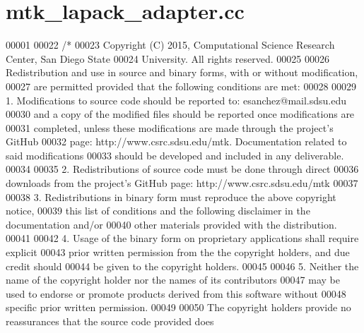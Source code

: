 \hypertarget{mtk__lapack__adapter_8cc_source}{\section{mtk\+\_\+lapack\+\_\+adapter.\+cc}
\label{mtk__lapack__adapter_8cc_source}
}

\begin{DoxyCode}
00001 
00022 \textcolor{comment}{/*}
00023 \textcolor{comment}{Copyright (C) 2015, Computational Science Research Center, San Diego State}
00024 \textcolor{comment}{University. All rights reserved.}
00025 \textcolor{comment}{}
00026 \textcolor{comment}{Redistribution and use in source and binary forms, with or without modification,}
00027 \textcolor{comment}{are permitted provided that the following conditions are met:}
00028 \textcolor{comment}{}
00029 \textcolor{comment}{1. Modifications to source code should be reported to: esanchez@mail.sdsu.edu}
00030 \textcolor{comment}{and a copy of the modified files should be reported once modifications are}
00031 \textcolor{comment}{completed, unless these modifications are made through the project's GitHub}
00032 \textcolor{comment}{page: http://www.csrc.sdsu.edu/mtk. Documentation related to said modifications}
00033 \textcolor{comment}{should be developed and included in any deliverable.}
00034 \textcolor{comment}{}
00035 \textcolor{comment}{2. Redistributions of source code must be done through direct}
00036 \textcolor{comment}{downloads from the project's GitHub page: http://www.csrc.sdsu.edu/mtk}
00037 \textcolor{comment}{}
00038 \textcolor{comment}{3. Redistributions in binary form must reproduce the above copyright notice,}
00039 \textcolor{comment}{this list of conditions and the following disclaimer in the documentation and/or}
00040 \textcolor{comment}{other materials provided with the distribution.}
00041 \textcolor{comment}{}
00042 \textcolor{comment}{4. Usage of the binary form on proprietary applications shall require explicit}
00043 \textcolor{comment}{prior written permission from the the copyright holders, and due credit should}
00044 \textcolor{comment}{be given to the copyright holders.}
00045 \textcolor{comment}{}
00046 \textcolor{comment}{5. Neither the name of the copyright holder nor the names of its contributors}
00047 \textcolor{comment}{may be used to endorse or promote products derived from this software without}
00048 \textcolor{comment}{specific prior written permission.}
00049 \textcolor{comment}{}
00050 \textcolor{comment}{The copyright holders provide no reassurances that the source code provided does}

\end{DoxyCode}
